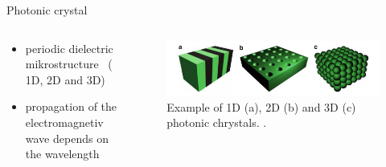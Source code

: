 \begin{frame}{Photonic crystal}
  \begin{columns}

    \begin{column}{0.49\textwidth}
    \begin{itemize}
      \setlength\itemsep{1.2em}
      \item{periodic dielectric mikrostructure \, ( 1D, 2D and 3D)}
      \item{propagation of the electromagnetiv wave depends on the wavelength}
    \end{itemize}
    \end{column}

    \begin{column}{0.49\textwidth}
    \begin{figure}
      \centering
      \includegraphics[width=1\textwidth]{./bilder/photonic_crystal_model.png}
      \caption{Example of 1D (a), 2D (b) and 3D (c) photonic chrystals. \cite{intro_pho}.}
      \label{fig: photonic_crystal}
    \end{figure}
  \end{column}

  \end{columns}

\end{frame}

